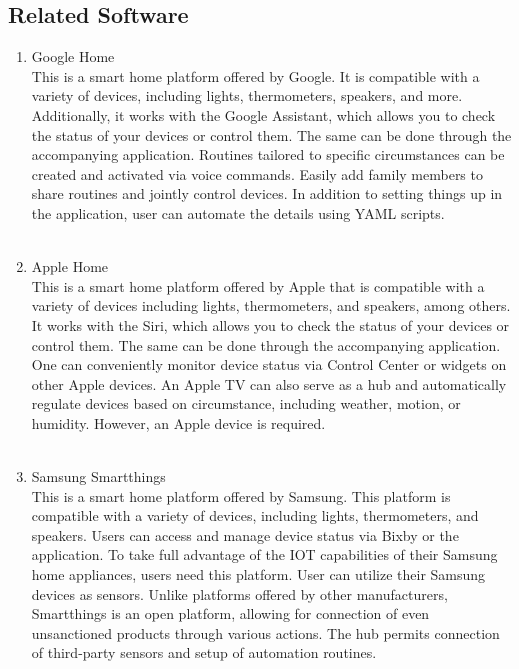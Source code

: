 \subsection {\large{Related Software}}
\begin{enumerate}[label=\alph*]
    \item Google Home\\
          This is a smart home platform offered by Google. It is compatible with a variety of devices, including lights, thermometers, speakers, and more. Additionally, it works with the Google Assistant, which allows you to check the status of your devices or control them. The same can be done through the accompanying application. Routines tailored to specific circumstances can be created and activated via voice commands. Easily add family members to share routines and jointly control devices. In addition to setting things up in the application, user can automate the details using YAML scripts.\\\\

    \item Apple Home\\
          This is a smart home platform offered by Apple that is compatible with a variety of devices including lights, thermometers, and speakers, among others. It works with the Siri, which allows you to check the status of your devices or control them. The same can be done through the accompanying application. One can conveniently monitor device status via Control Center or widgets on other Apple devices. An Apple TV can also serve as a hub and automatically regulate devices based on circumstance, including weather, motion, or humidity. However, an Apple device is required.\\\\

    \item Samsung Smartthings\\
          This is a smart home platform offered by Samsung. This platform is compatible with a variety of devices, including lights, thermometers, and speakers. Users can access and manage device status via Bixby or the application. To take full advantage of the IOT capabilities of their Samsung home appliances, users need this platform. User can utilize their Samsung devices as sensors. Unlike platforms offered by other manufacturers, Smartthings is an open platform, allowing for connection of even unsanctioned products through various actions. The hub permits connection of third-party sensors and setup of automation routines.\\\\


\end{enumerate}
